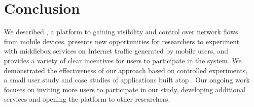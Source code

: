 \section{Conclusion}
\label{sec:conclusion}
We described \meddle, a platform to gaining visibility and control over 
network flows from mobile devices. \meddle presents new opportunities for researchers 
to experiment with middlebox services on Internet traffic generated by mobile users, and 
provides a variety of clear incentives for users to participate in the system. We demonstrated 
the effectiveness of our approach based on controlled experiments, a small user study and 
case studies of applications built atop \meddle. Our ongoing work focuses on inviting more 
users to participate in our study, developing additional \meddlebox services and opening 
the platform to other researchers. 

